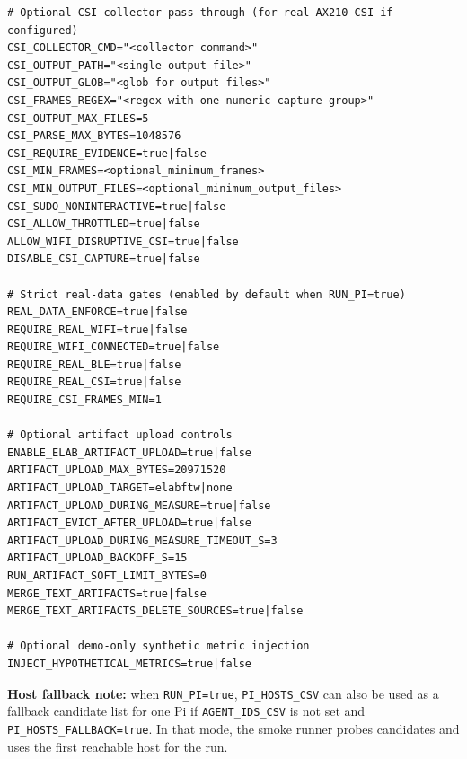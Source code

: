 \documentclass[11pt,a4paper]{article}
\begin{document}
\begin{verbatim}
# Optional CSI collector pass-through (for real AX210 CSI if configured)
CSI_COLLECTOR_CMD="<collector command>"
CSI_OUTPUT_PATH="<single output file>"
CSI_OUTPUT_GLOB="<glob for output files>"
CSI_FRAMES_REGEX="<regex with one numeric capture group>"
CSI_OUTPUT_MAX_FILES=5
CSI_PARSE_MAX_BYTES=1048576
CSI_REQUIRE_EVIDENCE=true|false
CSI_MIN_FRAMES=<optional_minimum_frames>
CSI_MIN_OUTPUT_FILES=<optional_minimum_output_files>
CSI_SUDO_NONINTERACTIVE=true|false
CSI_ALLOW_THROTTLED=true|false
ALLOW_WIFI_DISRUPTIVE_CSI=true|false
DISABLE_CSI_CAPTURE=true|false

# Strict real-data gates (enabled by default when RUN_PI=true)
REAL_DATA_ENFORCE=true|false
REQUIRE_REAL_WIFI=true|false
REQUIRE_WIFI_CONNECTED=true|false
REQUIRE_REAL_BLE=true|false
REQUIRE_REAL_CSI=true|false
REQUIRE_CSI_FRAMES_MIN=1

# Optional artifact upload controls
ENABLE_ELAB_ARTIFACT_UPLOAD=true|false
ARTIFACT_UPLOAD_MAX_BYTES=20971520
ARTIFACT_UPLOAD_TARGET=elabftw|none
ARTIFACT_UPLOAD_DURING_MEASURE=true|false
ARTIFACT_EVICT_AFTER_UPLOAD=true|false
ARTIFACT_UPLOAD_DURING_MEASURE_TIMEOUT_S=3
ARTIFACT_UPLOAD_BACKOFF_S=15
RUN_ARTIFACT_SOFT_LIMIT_BYTES=0
MERGE_TEXT_ARTIFACTS=true|false
MERGE_TEXT_ARTIFACTS_DELETE_SOURCES=true|false

# Optional demo-only synthetic metric injection
INJECT_HYPOTHETICAL_METRICS=true|false
\end{verbatim}

\textbf{Host fallback note:} when \texttt{RUN\_PI=true}, \texttt{PI\_HOSTS\_CSV} can also be used as a fallback candidate list for one Pi if \texttt{AGENT\_IDS\_CSV} is not set and \texttt{PI\_HOSTS\_FALLBACK=true}. In that mode, the smoke runner probes candidates and uses the first reachable host for the run.
\end{document}
